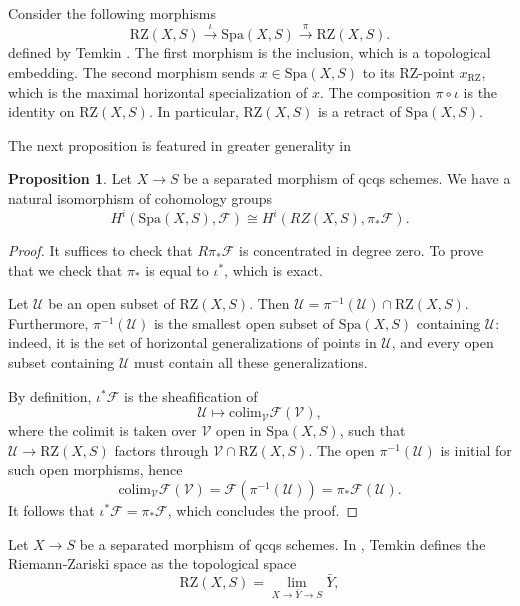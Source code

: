 \documentclass{amsart}
\def\Spa{\textrm{Spa}}
\def\RZ{\textrm{RZ}}
\theoremstyle{definition}
\newtheorem{proposition}[theorem]{Proposition}
\numberwithin{equation}{section}
\begin{document}
 Consider the following morphisms
\[
\RZ(X,S)\xrightarrow{\iota}\Spa(X,S)\xrightarrow{\pi}\RZ(X,S).
\]
defined by Temkin \cite{TemkinRZ}. The first morphism is the inclusion, which is a topological embedding. The second morphism sends $x\in \Spa(X,S)$ to its RZ-point $x_\RZ$, which is the maximal horizontal specialization of $x$. The composition $\pi\circ \iota$ is the identity on $\RZ(X,S)$. In particular, $\RZ(X,S)$ is a retract of $\Spa(X,S)$.

The next proposition is featured in greater generality in \cite [Corollary 5.7]{HubnerBaseChange}
\begin{proposition}\label{OpenEqualRZ}
	Let $X\to S$ be a separated morphism of qcqs schemes. We have a natural isomorphism of cohomology groups 
	\[
	H^i(\Spa(X,S),\mathcal{F})\cong H^i(RZ(X,S),\pi_*\mathcal{F}).
	\]
\end{proposition}
\begin{proof}
	It suffices to check that $R\pi_*\mathcal{F}$ is concentrated in degree zero. To prove that we check that $\pi_*$ is equal to $\iota^*$, which is exact.
	
	Let $\mathcal{U}$ be an open subset of $\RZ(X,S)$. Then $\mathcal{U}= \pi^{-1}(\mathcal{U})\cap \RZ(X,S)$. Furthermore, $\pi^{-1}(\mathcal{U})$ is the smallest open subset of $\Spa(X,S)$ containing $\mathcal{U}$: indeed, it is the set of horizontal generalizations of points in $\mathcal{U}$, and every open subset containing $\mathcal{U}$ must contain all these generalizations. 
	
	By definition, $\iota^*\mathcal{F}$ is the sheafification of
	\[
	\mathcal{U}\mapsto \textrm{colim}_{\mathcal{V}} \mathcal{F}(\mathcal{V}),
	\]
	where the colimit is taken over $\mathcal{V}$ open in $\Spa(X,S)$, such that $\mathcal{U}\to \RZ(X,S)$ factors through $\mathcal{V}\cap \RZ(X,S)$. The open $\pi^{-1}(\mathcal{U})$ is initial for such open morphisms, hence 
	\[
	\textrm{colim}_{\mathcal{V}} \mathcal{F}(\mathcal{V})= \mathcal{F}(\pi^{-1}(\mathcal{U}))=\pi_*\mathcal{F}(\mathcal{U}).
	\] 
	It follows that $\iota^*\mathcal{F}=\pi_*\mathcal{F}$, which concludes the proof.
\end{proof}
Let $X\to S$ be a separated morphism of qcqs schemes. In \cite{TemkinRZ}, Temkin defines the Riemann-Zariski space as the topological space
\begin{equation}\label{RZmaps}
	\RZ(X,S)=\lim_{X\to\bar{Y}\to S}\bar{Y},
\end{equation}
\end{document}
